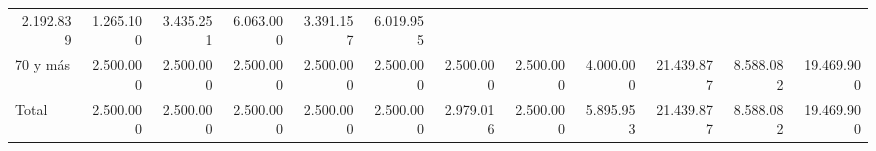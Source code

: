 \begin{tabular}{llllllllllll}
  \multicolumn{1}{r}{2.192.839} &
  \multicolumn{1}{r}{1.265.100} &
  \multicolumn{1}{r}{3.435.251} &
  \multicolumn{1}{r}{6.063.000} &
  \multicolumn{1}{r}{3.391.157} &
  \multicolumn{1}{r}{6.019.955} \\
\multicolumn{1}{l}{\hspace{1em}70 y más} &
  \multicolumn{1}{|r}{2.500.000} &
  \multicolumn{1}{r}{2.500.000} &
  \multicolumn{1}{r}{2.500.000} &
  \multicolumn{1}{r}{2.500.000} &
  \multicolumn{1}{r}{2.500.000} &
  \multicolumn{1}{r}{2.500.000} &
  \multicolumn{1}{r}{2.500.000} &
  \multicolumn{1}{r}{4.000.000} &
  \multicolumn{1}{r}{21.439.877} &
  \multicolumn{1}{r}{8.588.082} &
  \multicolumn{1}{r}{19.469.900} \\
\multicolumn{1}{l}{\hspace{1em}Total} &
  \multicolumn{1}{|r}{2.500.000} &
  \multicolumn{1}{r}{2.500.000} &
  \multicolumn{1}{r}{2.500.000} &
  \multicolumn{1}{r}{2.500.000} &
  \multicolumn{1}{r}{2.500.000} &
  \multicolumn{1}{r}{2.979.016} &
  \multicolumn{1}{r}{2.500.000} &
  \multicolumn{1}{r}{5.895.953} &
  \multicolumn{1}{r}{21.439.877} &
  \multicolumn{1}{r}{8.588.082} &
  \multicolumn{1}{r}{19.469.900} \\
\cline{1-12}
\end{tabular}
